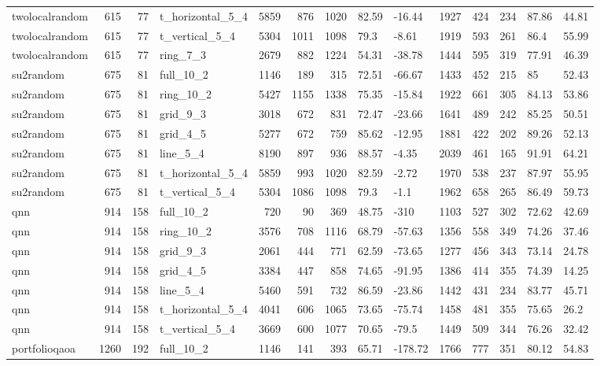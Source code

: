 \begin{longtable}{lrrlrrrllrrrll}
twolocalrandom & 615 & 77 & t\_horizontal\_5\_4 & 5859 & 876 & 1020 & 82.59 & -16.44 & 1927 & 424 & 234 & 87.86 & 44.81 \\
twolocalrandom & 615 & 77 & t\_vertical\_5\_4 & 5304 & 1011 & 1098 & 79.3 & -8.61 & 1919 & 593 & 261 & 86.4 & 55.99 \\
twolocalrandom & 615 & 77 & ring\_7\_3 & 2679 & 882 & 1224 & 54.31 & -38.78 & 1444 & 595 & 319 & 77.91 & 46.39 \\
su2random & 675 & 81 & full\_10\_2 & 1146 & 189 & 315 & 72.51 & -66.67 & 1433 & 452 & 215 & 85 & 52.43 \\
su2random & 675 & 81 & ring\_10\_2 & 5427 & 1155 & 1338 & 75.35 & -15.84 & 1922 & 661 & 305 & 84.13 & 53.86 \\
su2random & 675 & 81 & grid\_9\_3 & 3018 & 672 & 831 & 72.47 & -23.66 & 1641 & 489 & 242 & 85.25 & 50.51 \\
su2random & 675 & 81 & grid\_4\_5 & 5277 & 672 & 759 & 85.62 & -12.95 & 1881 & 422 & 202 & 89.26 & 52.13 \\
su2random & 675 & 81 & line\_5\_4 & 8190 & 897 & 936 & 88.57 & -4.35 & 2039 & 461 & 165 & 91.91 & 64.21 \\
su2random & 675 & 81 & t\_horizontal\_5\_4 & 5859 & 993 & 1020 & 82.59 & -2.72 & 1970 & 538 & 237 & 87.97 & 55.95 \\
su2random & 675 & 81 & t\_vertical\_5\_4 & 5304 & 1086 & 1098 & 79.3 & -1.1 & 1962 & 658 & 265 & 86.49 & 59.73 \\
qnn & 914 & 158 & full\_10\_2 & 720 & 90 & 369 & 48.75 & -310 & 1103 & 527 & 302 & 72.62 & 42.69 \\
qnn & 914 & 158 & ring\_10\_2 & 3576 & 708 & 1116 & 68.79 & -57.63 & 1356 & 558 & 349 & 74.26 & 37.46 \\
qnn & 914 & 158 & grid\_9\_3 & 2061 & 444 & 771 & 62.59 & -73.65 & 1277 & 456 & 343 & 73.14 & 24.78 \\
qnn & 914 & 158 & grid\_4\_5 & 3384 & 447 & 858 & 74.65 & -91.95 & 1386 & 414 & 355 & 74.39 & 14.25 \\
qnn & 914 & 158 & line\_5\_4 & 5460 & 591 & 732 & 86.59 & -23.86 & 1442 & 431 & 234 & 83.77 & 45.71 \\
qnn & 914 & 158 & t\_horizontal\_5\_4 & 4041 & 606 & 1065 & 73.65 & -75.74 & 1458 & 481 & 355 & 75.65 & 26.2 \\
qnn & 914 & 158 & t\_vertical\_5\_4 & 3669 & 600 & 1077 & 70.65 & -79.5 & 1449 & 509 & 344 & 76.26 & 32.42 \\
portfolioqaoa & 1260 & 192 & full\_10\_2 & 1146 & 141 & 393 & 65.71 & -178.72 & 1766 & 777 & 351 & 80.12 & 54.83 \\

\end{longtable}
